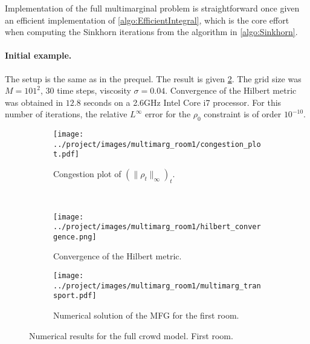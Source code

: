 \documentclass[../report.tex]{subfiles}
\begin{document}
Implementation of the full multimarginal problem is straightforward once given an efficient implementation of \cref{algo:EfficientIntegral}, which is the core effort when computing the Sinkhorn iterations from the algorithm in \cref{algo:Sinkhorn}.


\paragraph{Initial example.} The setup is the same as in the prequel. The result is given \cref{fig:NMargEx1Soltn}. The grid size was $M = 101^2$, $30$ time steps, viscosity $\sigma = 0.04$. Convergence of the Hilbert metric was obtained in $12.8$ seconds on a 2.6GHz Intel Core i7 processor. For this number of iterations, the relative $L^\infty$ error for the $\rho_0$ constraint is of order $10^{-10}$.

\begin{figure}[h]
	\centering
	\begin{subfigure}[c]{.4\linewidth}
	\texttt{[image: ../project/images/multimarg\_room1/congestion\_plot.pdf]}
	\caption{Congestion plot of $(\|\rho_t\|_\infty)_t$.}
	\end{subfigure}~
	\begin{subfigure}[c]{.4\linewidth}
		\texttt{[image: ../project/images/multimarg\_room1/hilbert\_convergence.png]}
		\caption{Convergence of the Hilbert metric.}
	\end{subfigure}
	\begin{subfigure}[c]{.8\linewidth}
		\texttt{[image: ../project/images/multimarg\_room1/multimarg\_transport.pdf]}
		\caption{Numerical solution of the MFG for the first room.}\label{fig:NMargEx1Soltn}
	\end{subfigure}
	\caption{Numerical results for the full crowd model. First room.}
\end{figure}

\begin{comment}
\begin{figure}[h]
	\centering
	\begin{subfigure}[c]{.4\linewidth}
		\texttt{[image: ../project/images/multimarg\_room2/congestion\_plot.pdf]}
		\caption{Congestion plot for the second room.}\label{fig:Room2CongestPlot}
	\end{subfigure}~
	\begin{subfigure}[c]{.4\linewidth}
		\texttt{[image: ../project/images/multimarg\_room2/hilbert\_convergence.png]}
		\caption{Convergence of the Hilbert metric.}
	\end{subfigure}
	\begin{subfigure}[c]{.6\linewidth}
		\texttt{[image: ../project/images/multimarg\_room2/multimarg\_transport.pdf]}
		\caption{Numerical solution of the MFG for the second example.}\label{fig:NMargEx2}
	\end{subfigure}
\end{figure}
\end{comment}
\end{document}
